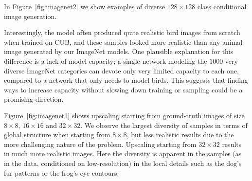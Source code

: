 \documentclass{article}
\begin{document}
In Figure~\ref{fig:imagenet2} we show examples of diverse $128 \times 128$ class conditional image generation. 

Interestingly, the model often produced quite realistic bird images from scratch when trained on CUB, and these samples looked more realistic than any animal image generated by our ImageNet models.
One plausible explanation for this difference is a lack of model capacity; a single network modeling the $1000$ very diverse ImageNet categories can devote only very limited capacity to each one, compared to a network that only needs to model birds.
This suggests that finding ways to increase capacity without slowing down training or sampling could be a promising direction.

Figure~\ref{fig:imagenet1} shows upscaling starting from ground-truth images of size $8 \times 8$, $16 \times 16$ and $32 \times 32$.
We observe the largest diversity of samples in terms of global structure when starting from $8 \times 8$, but less realistic results due to the more challenging nature of the problem.
Upscaling starting from $32 \times 32$ results in much more realistic images.
Here the diversity is apparent in the samples (as in the data, conditioned on low-resolution) in the local details such as the dog's fur patterns or the frog's eye contours.
\end{document}

